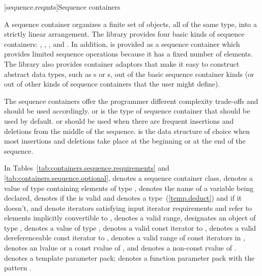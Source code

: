[sequence.reqmts]{Sequence containers}

\pnum
A sequence container organizes a finite set of objects, all of the same type, into a strictly
linear arrangement. The library provides four basic kinds of sequence containers:
, , , and . In addition,
 is provided as a sequence container which provides limited sequence operations
because it has a fixed number of elements. The library also provides container adaptors that
make it easy to construct abstract data types, such as s or s, out of
the basic sequence container kinds (or out of other kinds of sequence containers that the user
might define).

\pnum
The sequence containers
offer the programmer different complexity trade-offs and should be used
accordingly.
 or 
is the type of sequence container that should be used by default.
 or 
should be used when there are frequent insertions and deletions from the
middle of the sequence.
is the data structure of choice
when most insertions and deletions take place at the beginning or at the
end of the sequence.

\pnum
In Tables~\ref{tab:containers.sequence.requirements}
and \ref{tab:containers.sequence.optional},
 denotes a sequence container class,
 denotes a value of type  containing elements of type ,
 denotes the name of a variable being declared,
 denotes  if
the   is valid and denotes a
type~(\ref{temp.deduct}) and
 if it doesn't,
 and 
denote iterators satisfying input iterator requirements
and refer to elements implicitly convertible to ,
\tcode{[i, j)}
denotes a valid range,
 designates an object of type ,
denotes a value of type ,
 denotes a valid const iterator to
, 
denotes a valid dereferenceable const iterator to
, \tcode{[q1, q2)}
denotes a valid range of const iterators in
, 
denotes an lvalue or a const rvalue of
, and  denotes
a non-const rvalue of .
 denotes a template parameter pack;
 denotes a function parameter pack with the pattern .

